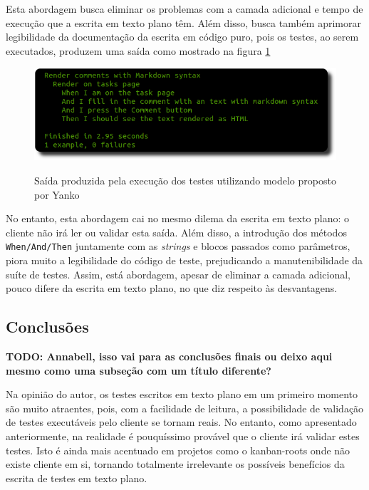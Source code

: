 Esta abordagem busca eliminar os problemas com a camada adicional e tempo de execução que a escrita em texto plano têm. Além disso, busca também aprimorar legibilidade da documentação da escrita em código puro, pois os testes, ao serem executados, produzem uma saída como mostrado na figura \ref{img:output-novo-modelo}

\begin{figure}[h]
  \center
  \caption{Saída produzida pela execução dos testes utilizando modelo proposto por Yanko}
  \includegraphics[scale=0.6]{images/output-novo-modelo}
  \label{img:output-novo-modelo}
\end{figure}

No entanto, esta abordagem cai no mesmo dilema da escrita em texto plano: o cliente não irá ler ou validar esta saída. Além disso, a introdução dos métodos \texttt{When/And/Then} juntamente com as \textit{strings} e blocos passados como parâmetros, piora muito a legibilidade do código de teste, prejudicando a manutenibilidade da suíte de testes. Assim, está abordagem, apesar de eliminar a camada adicional, pouco difere da escrita em texto plano, no que diz respeito às desvantagens.


\subsection{Conclusões}
\label{sub:conclusoes_bdd}

\textbf{TODO: Annabell, isso vai para as conclusões finais ou deixo aqui mesmo como uma subseção com um título diferente?}

Na opinião do autor, os testes escritos em texto plano em um primeiro momento são muito atraentes, pois, com a facilidade de leitura, a possibilidade de validação de testes executáveis pelo cliente se tornam reais. No entanto, como apresentado anteriormente, na realidade é pouquíssimo provável que o cliente irá validar estes testes. Isto é ainda mais acentuado em projetos como o kanban-roots onde não existe cliente em si, tornando totalmente irrelevante os possíveis benefícios da escrita de testes em texto plano.

